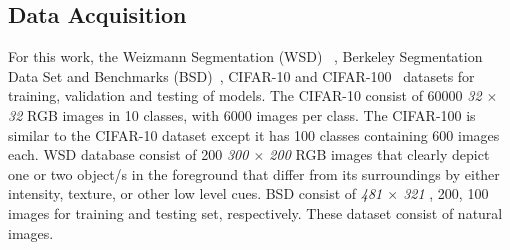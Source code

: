\documentclass{WitsPhysicsReport}
\begin{document}
\subsection{Data Acquisition}
\label{sec:Datasets}
For this work, the Weizmann Segmentation (WSD)~\cite{AlpertGBB07} , Berkeley Segmentation Data Set and Benchmarks (BSD)~\cite{amfm_pami2011}, CIFAR-10 and CIFAR-100~\cite{krizhevsky2009learning} datasets for training, validation and testing of models. The CIFAR-10 consist of 60000 \textit{32 $\times$ 32} RGB images in 10 classes, with 6000 images per class. The CIFAR-100 is similar to the CIFAR-10 dataset except it has 100 classes containing 600 images each.  WSD database consist of 200 \textit{300 $\times$ 200} RGB images that clearly depict one or two object/s in the foreground that differ from its surroundings by either intensity, texture, or other low level cues.  BSD consist of \textit{481 $\times$ 321} , 200, 100 images for training and testing set, respectively. These dataset consist of natural images.

\end{document}
